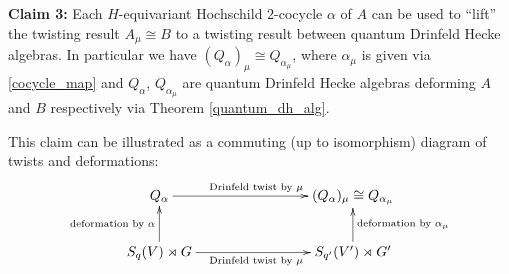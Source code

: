 \documentclass[10pt]{article}
\newcommand{\bb}{\medbreak}
\newcommand{\nt}{\noindent}
\newcommand{\al}{\alpha}
\newcommand{\definex}[1]{\textbf{#1}}
\theoremstyle{definition}
\begin{document}
\nt \definex{Claim 3:} Each $H$-equivariant Hochschild $2$-cocycle $\alpha$ of $A$ can be used to ``lift'' the twisting result $A_\mu\cong B$ to a twisting result between quantum Drinfeld Hecke algebras. In particular we have $(Q_\alpha)_\mu \cong Q_{\alpha_\mu}$, where $\alpha_\mu$ is given via \eqref{cocycle_map} and $Q_\alpha$, $Q_{\alpha_\mu}$ are quantum Drinfeld Hecke algebras deforming $A$ and $B$ respectively via Theorem \ref{quantum_dh_alg}.\bb


\nt  This claim can be illustrated as a commuting (up to isomorphism) diagram of twists and deformations: 
$$\xymatrix@C=8em{
  Q_\alpha \ar[r]^{\text{Drinfeld twist by }\mu} & (Q_\alpha)_\mu \cong Q_{\alpha_\mu}\\
  S_q(V)\rtimes G \ar[u]^{\text{deformation by }\alpha} \ar[r]_{\text{Drinfeld twist by }\mu} & S_{q'}(V')\rtimes G' \ar[u]_{\text{deformation by }\alpha_\mu}
}$$
\end{document}
